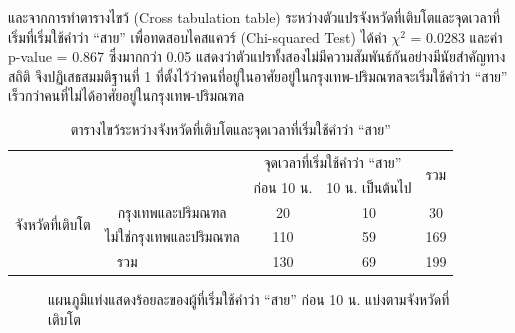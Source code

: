 \documentclass[a4paper]{article}
\begin{document}
    และจากการทำตารางไขว้ (Cross tabulation table) ระหว่างตัวแปรจังหวัดที่เติบโตและจุดเวลาที่เริ่มที่เริ่มใช้คำว่า “สาย” เพื่อทดสอบไคสแควร์ (Chi-squared Test) ได้ค่า $\chi^2$ = 0.0283 และค่า p-value = 0.867 ซึ่งมากกว่า 0.05 แสดงว่าตัวแปรทั้งสองไม่มีความสัมพันธ์กันอย่างมีนัยสำคัญทางสถิติ จึงปฏิเสธสมมติฐานที่ 1 ที่ตั้งไว้ว่าคนที่อยู่ในอาศัยอยู่ในกรุงเทพ-ปริมณฑลจะเริ่มใช้คำว่า “สาย” เร็วกว่าคนที่ไม่ได้อาศัยอยู่ในกรุงเทพ-ปริมณฑล
    \begin{table}[!ht]
        \begin{center}
        \begin{tabular}{|c|c|c|c|c|}
            \cline{3-5}
            \multicolumn{2}{c|}{} & \multicolumn{2}{c|}{จุดเวลาที่เริ่มใช้คำว่า “สาย”} & \multirow{2}{*}{รวม} \\
            \cline{3-4}
            \multicolumn{2}{c|}{} & ก่อน 10 น. & 10 น. เป็นต้นไป & \\
            \hline
            \multirow{2}{*}{จังหวัดที่เติบโต} & กรุงเทพและปริมณฑล & 20 & 10 & 30 \\
            \cline{2-5}
            & ไม่ใช่กรุงเทพและปริมณฑล & 110 & 59 & 169 \\
            \hline
            \multicolumn{2}{|c|}{รวม} & 130 & 69 & 199 \\
            \hline
        \end{tabular}
        \end{center}
        \caption{ตารางไขว้ระหว่างจังหวัดที่เติบโตและจุดเวลาที่เริ่มใช้คำว่า “สาย”}
    \end{table}
    \begin{figure}[!ht]
        \begin{center}
        \end{center}
        \caption{แผนภูมิแท่งแสดงร้อยละของผู้ที่เริ่มใช้คำว่า “สาย” ก่อน 10 น. แบ่งตามจังหวัดที่เติบโต}
    \end{figure}
\end{document}
